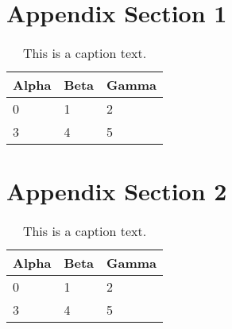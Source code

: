 \Blindtext[1][1]

\section{Appendix Section 1}
\label{sec:appendix:sec1}

\Blindtext[1][1]

\begin{table}[h]
	\begin{tabularx}{\textwidth}{X | X | X}
		Alpha		& Beta			& Gamma			\\ \hline
		0			& 1				& 2				\\ \hline
		3			& 4				& 5				\\ %
	\end{tabularx}
	\label{tab:table1}
	\caption{This is a caption text.}
\end{table}

\section{Appendix Section 2}
\label{sec:appendix:sec2}

\Blindtext[1][1]

\begin{table}[h]
	\begin{tabularx}{\textwidth}{X | X | X}
		Alpha		& Beta			& Gamma			\\ \hline
		0			& 1				& 2				\\ \hline
		3			& 4				& 5				\\ %
	\end{tabularx}
	\label{tab:table2}
	\caption{This is a caption text.}
\end{table}

\Blindtext[1][2]
